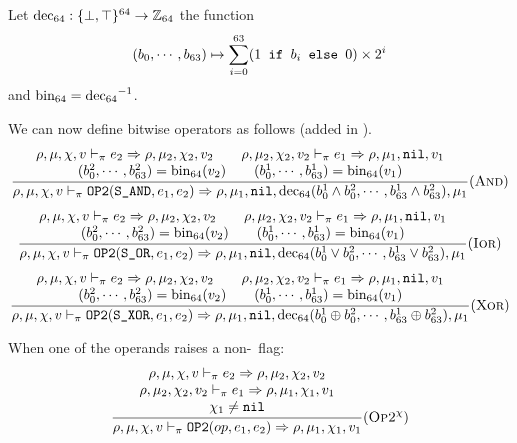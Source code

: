 Let \(\operatorname{dec_{64}}: \{ \bot, \top \}^{64} \to \mathbb{Z}_{64}\) the function
\[(b_0, \cdots, b_{63}) \mapsto \sum_{i=0}^{63} (1\texttt{ if } b_i\texttt{ else }0)\times 2^i\]
and \(\operatorname{bin_{64}} = \operatorname{dec_{64}}^{-1}\).

We can now define bitwise operators as follows (added in \Cmp).\\
\[\dfrac{\begin{array}{c}
    \rho,\mu,\chi,v \vdash_\pi e_2\Rightarrow \rho,\mu_2,\chi_2,v_2 \qquad \rho,\mu_2,\chi_2,v_2\vdash_\pi e_1\Rightarrow \rho,\mu_1,\texttt{nil},v_1 \\
    (b_0^2,\cdots,b_{63}^2) = \operatorname{bin_{64}}(v_2) \qquad (b_0^1,\cdots,b_{63}^1) = \operatorname{bin_{64}}(v_1)
\end{array}}{\rho,\mu,\chi,v \vdash_\pi \texttt{OP2}(\texttt{S\_AND}, e_1, e_2) \Rightarrow \rho,\mu_1,\texttt{nil},\operatorname{dec_{64}}(b_0^1 \wedge b_0^2,\cdots, b_{63}^1 \wedge b_{63}^2),\mu_1} (\textsc{And})\]
\[\dfrac{\begin{array}{c}
    \rho,\mu,\chi,v \vdash_\pi e_2\Rightarrow \rho,\mu_2,\chi_2,v_2 \qquad \rho,\mu_2,\chi_2,v_2\vdash_\pi e_1\Rightarrow \rho,\mu_1,\texttt{nil},v_1 \\
    (b_0^2,\cdots,b_{63}^2) = \operatorname{bin_{64}}(v_2) \qquad (b_0^1,\cdots,b_{63}^1) = \operatorname{bin_{64}}(v_1)
\end{array}}{\rho,\mu,\chi,v \vdash_\pi \texttt{OP2}(\texttt{S\_OR}, e_1, e_2) \Rightarrow \rho,\mu_1,\texttt{nil},\operatorname{dec_{64}}(b_0^1 \vee b_0^2,\cdots, b_{63}^1 \vee b_{63}^2),\mu_1} (\textsc{Ior})\]
\[\dfrac{\begin{array}{c}
    \rho,\mu,\chi,v \vdash_\pi e_2\Rightarrow \rho,\mu_2,\chi_2,v_2 \qquad \rho,\mu_2,\chi_2,v_2\vdash_\pi e_1\Rightarrow \rho,\mu_1,\texttt{nil},v_1 \\
    (b_0^2,\cdots,b_{63}^2) = \operatorname{bin_{64}}(v_2) \qquad (b_0^1,\cdots,b_{63}^1) = \operatorname{bin_{64}}(v_1)
\end{array}}{\rho,\mu,\chi,v \vdash_\pi \texttt{OP2}(\texttt{S\_XOR}, e_1, e_2) \Rightarrow \rho,\mu_1,\texttt{nil},\operatorname{dec_{64}}(b_0^1 \oplus b_0^2,\cdots, b_{63}^1 \oplus b_{63}^2),\mu_1} (\textsc{Xor})\]

When one of the operands raises a non-\nil\ flag:
\[\dfrac{\begin{array}{c}
    \rho,\mu,\chi,v \vdash_\pi e_2\Rightarrow \rho,\mu_2,\chi_2,v_2 \\
    \rho,\mu_2,\chi_2,v_2 \vdash_\pi e_1\Rightarrow \rho,\mu_1,\chi_1,v_1 \\
    \chi_1\ne\texttt{nil}
\end{array}}{\rho,\mu,\chi,v \vdash_\pi \texttt{OP2}(op, e_1, e_2) \Rightarrow \rho,\mu_1,\chi_1,v_1} (\textsc{Op2}^\chi)\]

